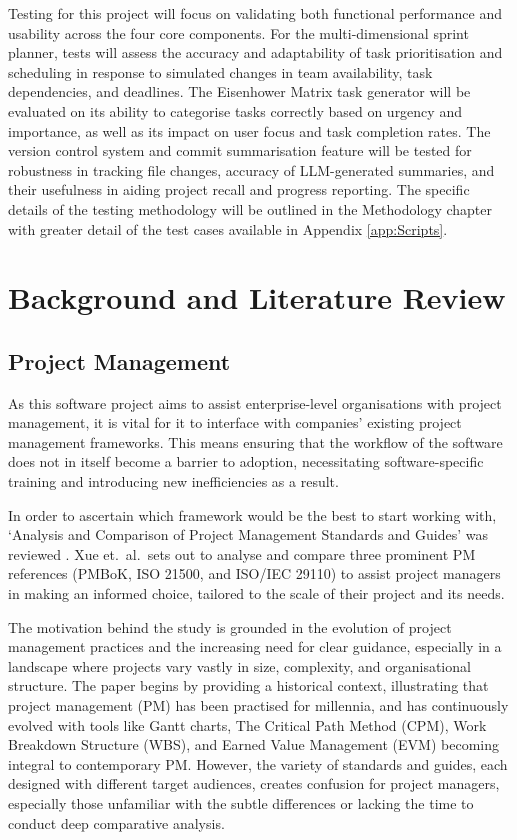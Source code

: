 \documentclass{report}
\begin{document}
Testing for this project will focus on validating both functional performance and usability across the four core components. 
For the multi-dimensional sprint planner, tests will assess the accuracy and adaptability of task prioritisation and scheduling in response to simulated changes in team availability, task dependencies, and deadlines. 
The Eisenhower Matrix task generator will be evaluated on its ability to categorise tasks correctly based on urgency and importance, as well as its impact on user focus and task completion rates.
The version control system and commit summarisation feature will be tested for robustness in tracking file changes, accuracy of LLM-generated summaries, and their usefulness in aiding project recall and progress reporting. 
The specific details of the testing methodology will be outlined in the Methodology chapter with greater detail of the test cases available in Appendix \ref{app:Scripts}.

\chapter{Background and Literature Review}  %
\section{Project Management}

As this software project aims to assist enterprise-level organisations with project management, it is vital for it to interface with companies' existing project management frameworks. 
This means ensuring that the workflow of the software does not in itself become a barrier to adoption, necessitating software-specific training and introducing new inefficiencies as a result.

In order to ascertain which framework would be the best to start working with, `Analysis and Comparison of Project Management Standards and Guides' was reviewed \parencite{xueAnalysisComparisonProject}.
Xue et.\ al.\ sets out to analyse and compare three prominent PM references (PMBoK, ISO 21500, and ISO/IEC 29110) to assist project managers in making an informed choice, tailored to the scale of their project and its needs.

The motivation behind the study is grounded in the evolution of project management practices and the increasing need for clear guidance, especially in a landscape where projects vary vastly in size, complexity, and organisational structure. 
The paper begins by providing a historical context, illustrating that project management (PM) has been practised for millennia, and has continuously evolved with tools like Gantt charts, The Critical Path Method (CPM), Work Breakdown Structure (WBS), and Earned Value Management (EVM) becoming integral to contemporary PM. 
However, the variety of standards and guides, each designed with different target audiences, creates confusion for project managers, especially those unfamiliar with the subtle differences or lacking the time to conduct deep comparative analysis.
\end{document}

